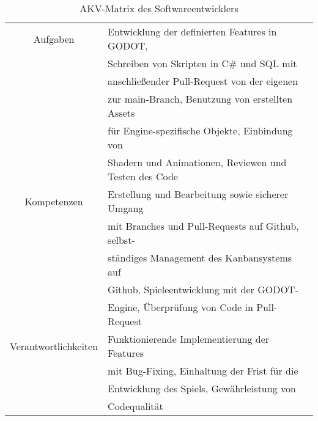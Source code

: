 \begin{table}[H]
    \begin{center}
        \label{tab:softwareentwickler}
        \begin{tabular}{c|p{9cm}}
            Aufgaben & Entwicklung der definierten Features in GODOT, \\
            & Schreiben von Skripten in C\# und SQL mit \\
            & anschließender Pull-Request von der eigenen \\
            & zur main-Branch, Benutzung von erstellten Assets\\
            & für Engine-spezifische Objekte, Einbindung von \\
            & Shadern und Animationen, Reviewen und Testen des Code \\
            \hline
            Kompetenzen & Erstellung und Bearbeitung sowie sicherer Umgang \\
            & mit Branches und Pull-Requests auf Github, selbst- \\
            & ständiges Management des Kanbansystems auf \\
            & Github, Spieleentwicklung mit der GODOT- \\
            & Engine, Überprüfung von Code in Pull-Request \\
            \hline
            Verantwortlichkeiten & Funktionierende Implementierung der Features \\
            & mit Bug-Fixing, Einhaltung der Frist für die \\
            & Entwicklung des Spiels, Gewährleistung von \\
            & Codequalität \\
        \end{tabular}
        \caption{AKV-Matrix des Softwareentwicklers}
    \end{center}
\end{table}
